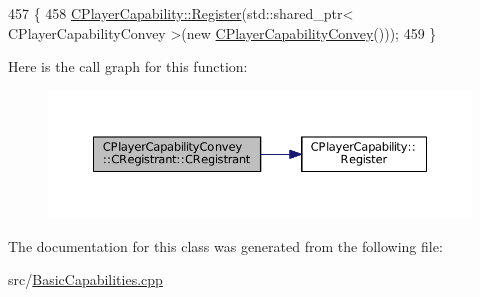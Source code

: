 \begin{DoxyCode}
457                                                \{
458     \hyperlink{classCPlayerCapability_a7e298018dcde2684451add3cfff065f7}{CPlayerCapability::Register}(std::shared\_ptr< CPlayerCapabilityConvey >(\textcolor{keyword}{new} 
      \hyperlink{classCPlayerCapabilityConvey_a49f00731755778e903503796adbbe451}{CPlayerCapabilityConvey}()));   
459 \}
\end{DoxyCode}
Here is the call graph for this function\+:\nopagebreak
\begin{figure}[H]
\begin{center}
\leavevmode
\includegraphics[width=350pt]{classCPlayerCapabilityConvey_1_1CRegistrant_a7ceb41f660b3b73dff670952658a2883_cgraph}
\end{center}
\end{figure}


The documentation for this class was generated from the following file\+:\begin{DoxyCompactItemize}
\item 
src/\hyperlink{BasicCapabilities_8cpp}{Basic\+Capabilities.\+cpp}\end{DoxyCompactItemize}

